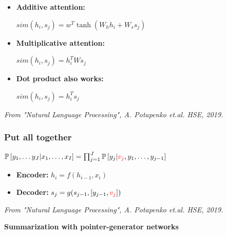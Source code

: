 \documentclass{tum-presentation}
\begin{document}
\begin{frame}
	\begin{itemize}
	\huge\item \textbf{\textcolor{TUMBlau}{Additive attention:}}
	\begin{center}
			$sim(h_i, s_j)=w^T \tanh(W_h h_i + W_s s_j)$
	\end{center}
	\vskip 0.2in
	\item \textbf{\textcolor{TUMBlau}{Multiplicative attention:}}
	\begin{center}
	$sim(h_i, s_j)=h_i^T Ws_j$
	\end{center}
	\vskip 0.2in
	\item \textbf{\textcolor{TUMBlau}{Dot product also works:}}
	\begin{center}
	$sim(h_i, s_j)=h_i^T s_j$
	\end{center}	
\end{itemize}	
	\begin{flushright}
	\textit{	From "Natural Language Processing", A. Potapenko et.al. HSE, 2019. }
	\end{flushright}
\end{frame}

\begin{frame}
	\frametitle{Put all together}
	\vskip 0.5in
	\centering \huge $\mathbb{P}\left[ y_{1}, \dots y_{J} | x_1, \dots, x_I \right] = 
	\prod_{j=1}^{J} \mathbb{P}\left[ y_{j} |  \textcolor{red}{v_j}, y_1, \dots, y_{j-1}\right]$
	\begin{itemize}
		\vskip 0.5in
		\item \textbf{\textcolor{TUMBlau}{Encoder:}} 
		$h_i = f(h_{i-1}, x_i)$
		\vskip 0.5in
		\item \textbf{\textcolor{TUMBlau}{Decoder:}}
		$s_j=g(s_{j-1}, [y_{j-1}, \textcolor{red}{v_j}])$
	\end{itemize}
	\begin{flushright}
	\small \textit{From "Natural Language Processing", A. Potapenko et.al. HSE, 2019.}
	\end{flushright}
\end{frame}

\begin{frame}[c]
	\centering
	\begin{center}
		\Huge\textbf{Summarization with pointer-generator networks}
	\end{center}
\end{frame}
\end{document}

